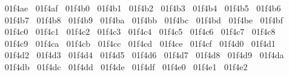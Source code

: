 {  ^^^^^^01f4ae%
  ^^^^^^01f4af%
  ^^^^^^01f4b0%
  ^^^^^^01f4b1%
  ^^^^^^01f4b2%
  ^^^^^^01f4b3%
  ^^^^^^01f4b4%
  ^^^^^^01f4b5%
  ^^^^^^01f4b6%
  ^^^^^^01f4b7%
  ^^^^^^01f4b8%
  ^^^^^^01f4b9%
  ^^^^^^01f4ba%
  ^^^^^^01f4bb%
  ^^^^^^01f4bc%
  ^^^^^^01f4bd%
  ^^^^^^01f4be%
  ^^^^^^01f4bf%
  ^^^^^^01f4c0%
  ^^^^^^01f4c1%
  ^^^^^^01f4c2%
  ^^^^^^01f4c3%
  ^^^^^^01f4c4%
  ^^^^^^01f4c5%
  ^^^^^^01f4c6%
  ^^^^^^01f4c7%
  ^^^^^^01f4c8%
  ^^^^^^01f4c9%
  ^^^^^^01f4ca%
  ^^^^^^01f4cb%
  ^^^^^^01f4cc%
  ^^^^^^01f4cd%
  ^^^^^^01f4ce%
  ^^^^^^01f4cf%
  ^^^^^^01f4d0%
  ^^^^^^01f4d1%
  ^^^^^^01f4d2%
  ^^^^^^01f4d3%
  ^^^^^^01f4d4%
  ^^^^^^01f4d5%
  ^^^^^^01f4d6%
  ^^^^^^01f4d7%
  ^^^^^^01f4d8%
  ^^^^^^01f4d9%
  ^^^^^^01f4da%
  ^^^^^^01f4db%
  ^^^^^^01f4dc%
  ^^^^^^01f4dd%
  ^^^^^^01f4de%
  ^^^^^^01f4df%
  ^^^^^^01f4e0%
  ^^^^^^01f4e1%
  ^^^^^^01f4e2%
}
